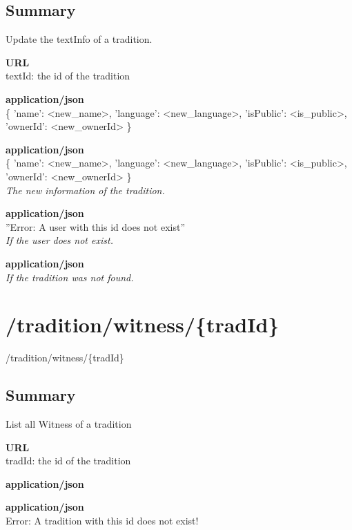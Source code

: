 \documentclass[11pt,fleqn,openany]{book} %
\begin{document}
\subsection*{Summary}
Update the textInfo of a tradition.
\begin{parameter}\textbf{URL}\\
textId: the id of the tradition \\
\end{parameter}
\begin{parameter}
\textbf{application/json}\\
\{  'name': <new\_name>, 'language': <new\_language>, 'isPublic': <is\_public>, 'ownerId': <new\_ownerId>  \}
\end{parameter}
\begin{return}[SUCCESS]
\textbf{application/json}\\
\{  'name': <new\_name>, 'language': <new\_language>, 'isPublic': <is\_public>, 'ownerId': <new\_ownerId>  \}\\
\textit{The new information of the tradition.}
\end{return}
\begin{return}[CONFLICT]
\textbf{application/json}\\
''Error: A user with this id does not exist''\\
\textit{If the user does not exist. }
\end{return}
\begin{return}
\textbf{application/json}\\
\textit{If the tradition was not found. }
\end{return}

\section{/tradition/witness/\{tradId\}}
\begin{get}
/tradition/witness/\{tradId\}
\end{get}

\subsection*{Summary}
List all Witness of a tradition
\begin{parameter}\textbf{URL}\\
tradId: the id of the tradition \\
\end{parameter}
\begin{return}[OK]
\textbf{application/json}\\

\end{return}
\begin{return}
\textbf{application/json}\\
Error: A tradition with this id does not exist!
\end{return}
\end{document}
